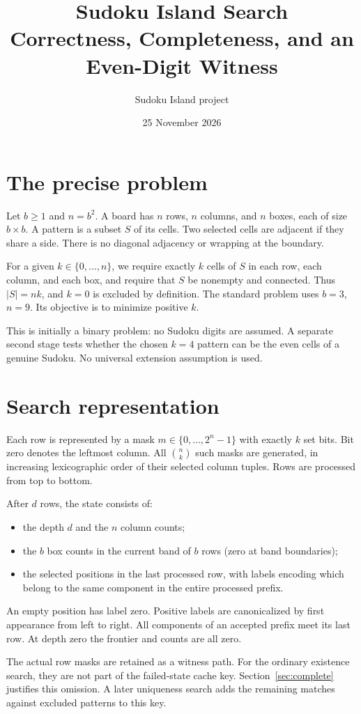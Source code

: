 \documentclass[11pt,a4paper]{article}
\title{Sudoku Island Search\\\large Correctness, Completeness, and an Even-Digit Witness}
\author{Sudoku Island project}
\date{25 November 2026}
\begin{document}
\maketitle

\section{The precise problem}
Let $b\geq1$ and $n=b^2$. A board has $n$ rows, $n$ columns, and $n$
boxes, each of size $b\times b$. A pattern is a subset $S$ of its cells.
Two selected cells are adjacent if they share a side. There is no diagonal
adjacency or wrapping at the boundary.

For a given $k\in\{0,\ldots,n\}$, we require exactly $k$ cells of $S$ in
each row, each column, and each box, and require that $S$ be nonempty and
connected. Thus $|S|=nk$, and $k=0$ is excluded by definition. The standard
problem uses $b=3$, $n=9$. Its objective is to minimize positive $k$.

This is initially a binary problem: no Sudoku digits are assumed. A separate
second stage tests whether the chosen $k=4$ pattern can be the even cells of
a genuine Sudoku. No universal extension assumption is used.

\section{Search representation}
Each row is represented by a mask $m\in\{0,\ldots,2^n-1\}$ with exactly
$k$ set bits. Bit zero denotes the leftmost column. All
$\binom{n}{k}$ such masks are generated, in increasing lexicographic order
of their selected column tuples. Rows are processed from top to bottom.

After $d$ rows, the state consists of:
\begin{itemize}
\item the depth $d$ and the $n$ column counts;
\item the $b$ box counts in the current band of $b$ rows (zero at band boundaries);
\item the selected positions in the last processed row, with labels encoding
which belong to the same component in the entire processed prefix.
\end{itemize}
An empty position has label zero. Positive labels are canonicalized by first
appearance from left to right. All components of an accepted prefix meet its
last row. At depth zero the frontier and counts are all zero.

The actual row masks are retained as a witness path. For the ordinary
existence search, they are not part of the failed-state cache key.
Section~\ref{sec:complete} justifies this omission. A later uniqueness search
adds the remaining matches against excluded patterns to this key.
\end{document}
